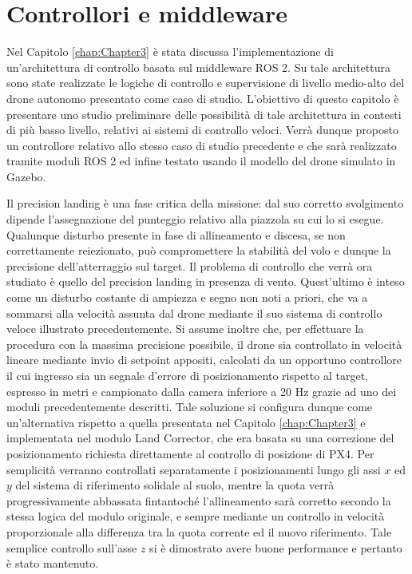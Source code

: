 
\chapter[Controllori e middleware]{Controllori e middleware}
\label{chap:Chapter4} 
\doublespacing
\fontsize{12}{12}\selectfont
{}
\indent Nel Capitolo \ref{chap:Chapter3} è stata discussa l'implementazione di un'architettura di controllo basata sul middleware ROS 2. Su tale architettura sono state realizzate le logiche di controllo e supervisione di livello medio-alto del drone autonomo presentato come caso di studio. L'obiettivo di questo capitolo è presentare uno studio preliminare delle possibilità di tale architettura in contesti di più basso livello, relativi ai sistemi di controllo veloci. Verrà dunque proposto un controllore relativo allo stesso caso di studio precedente e che sarà realizzato tramite moduli ROS 2 ed infine testato usando il modello del drone simulato in Gazebo.

\indent Il precision landing è una fase critica della missione: dal suo corretto svolgimento dipende l'assegnazione del punteggio relativo alla piazzola su cui lo si esegue. Qualunque disturbo presente in fase di allineamento e discesa, se non correttamente reiezionato, può compromettere la stabilità del volo e dunque la precisione dell'atterraggio sul target. Il problema di controllo che verrà ora studiato è quello del precision landing in presenza di vento. Quest'ultimo è inteso come un disturbo costante di ampiezza e segno non noti a priori, che va a sommarsi alla velocità assunta dal drone mediante il suo sistema di controllo veloce illustrato precedentemente. Si assume inoltre che, per effettuare la procedura con la massima precisione possibile, il drone sia controllato in velocità lineare mediante invio di setpoint appositi, calcolati da un opportuno controllore il cui ingresso sia un segnale d'errore di posizionamento rispetto al target, espresso in metri e campionato dalla camera inferiore a 20 Hz grazie ad uno dei moduli precedentemente descritti. Tale soluzione si configura dunque come un'alternativa rispetto a quella presentata nel Capitolo \ref{chap:Chapter3} e implementata nel modulo Land Corrector, che era basata su una correzione del posizionamento richiesta direttamente al controllo di posizione di PX4. Per semplicità verranno controllati separatamente i posizionamenti lungo gli assi $x$ ed $y$ del sistema di riferimento solidale al suolo, mentre la quota verrà progressivamente abbassata fintantoché l'allineamento sarà corretto secondo la stessa logica del modulo originale, e sempre mediante un controllo in velocità proporzionale alla differenza tra la quota corrente ed il nuovo riferimento. Tale semplice controllo sull'asse $z$ si è dimostrato avere buone performance e pertanto è stato mantenuto.

